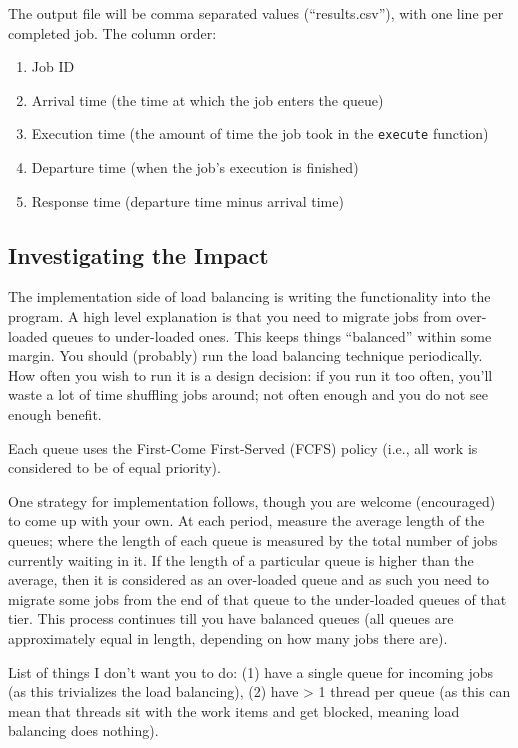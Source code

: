 \documentclass[letterpaper,10pt]{article}
\begin{document}
The output file will be comma separated values (``results.csv''), with one line per completed job. The column order:
\begin{enumerate}
	\item Job ID
	\item Arrival time (the time at which the job enters the queue)
	\item Execution time (the amount of time the job took in the \texttt{execute} function)
	\item Departure time (when the job's execution is finished)
	\item Response time (departure time minus arrival time)
\end{enumerate}


\subsection{Investigating the Impact}

The implementation side of load balancing is writing the functionality into the program. A high level explanation is that you need to migrate jobs from over-loaded queues to under-loaded ones. This keeps things ``balanced'' within some margin. You should (probably) run the load balancing technique periodically. How often you wish to run it is a design decision: if you run it too often, you'll waste a lot of time shuffling jobs around; not often enough and you do not see enough benefit.

Each queue uses the First-Come First-Served (FCFS) policy (i.e., all work is considered to be of equal priority).

One strategy for implementation follows, though you are welcome (encouraged) to come up with your own. At each period, measure the average length of the queues; where the length of each queue is measured by the total number of jobs currently waiting in it. If the length of a particular queue is higher than the average, then it is considered as an over-loaded queue and as such you need to migrate some jobs from the end of that queue to the under-loaded queues of that tier. This process continues till you have balanced queues (all queues are approximately equal in length, depending on how many jobs there are).

List of things I don't want you to do: (1) have a single queue for incoming jobs (as this trivializes the load balancing), (2) have > 1 thread per queue (as this can mean that threads sit with the work items and get blocked, meaning load balancing does nothing).
\end{document}

